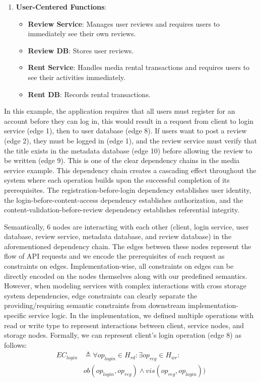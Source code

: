 \begin{enumerate}[leftmargin=*,noitemsep,topsep=2pt]
  \item \textbf{User-Centered Functions}:
    \begin{itemize}[leftmargin=*, noitemsep,topsep=0pt]
      \item \textbf{Review Service}: Manages user reviews and
        requires users to immediately see their own reviews.
      \item \textbf{Review DB}: Stores user reviews.
      \item \textbf{Rent Service}: Handles media rental transactions
        and requires users to see their activities immediately.
      \item \textbf{Rent DB}: Records rental transactions.
    \end{itemize}
\end{enumerate}

In this example, the application requires that all users must register for
an account before they can log in, this would result in a request from
client to login service (edge 1), then to user database (edge 8).
If users want to post a review (edge 2), they must
be logged in (edge 1), and the review service must verify that the
title exists
in the metadata database (edge 10) before allowing the review to be
written (edge 9).
This is one of the clear dependency chains in the media service example.
This dependency chain creates a cascading effect throughout the system
where each operation builds upon the successful completion of its
prerequisites.
The registration-before-login dependency establishes user identity,
the login-before-content-access dependency establishes authorization,
and the content-validation-before-review dependency establishes
referential integrity.

Semantically, 6 nodes are interacting with each other (client,
  login service, user database, review service, metadata database,
and review database) in the aforementioned dependency chain.
The edges between these nodes represent the flow of API requests and we
encode the prerequisites of each request as constraints on edges.
Implementation-wise, all constraints on edges can be
directly encoded on the nodes themselves along with our
predefined semantics. However, when modeling
services with complex interactions with cross storage system
dependencies, edge constraints can clearly
separate the providing/requiring semantic constraints from downstream
implementation-specific
service logic. In the implementation, we defined multiple operations
with read or write type to represent interactions between client,
service nodes, and storage nodes.
Formally, we can represent client's login operation (edge 8) as follows:
\begin{align*}
  EC_{login} &\triangleq \forall op_{login} \in H_{rd} : \exists
  op_{reg} \in H_{wr} :\\
&ob(op_{login}, op_{reg}) \land vis(op_{reg}, op_{login}))
\end{align*}

